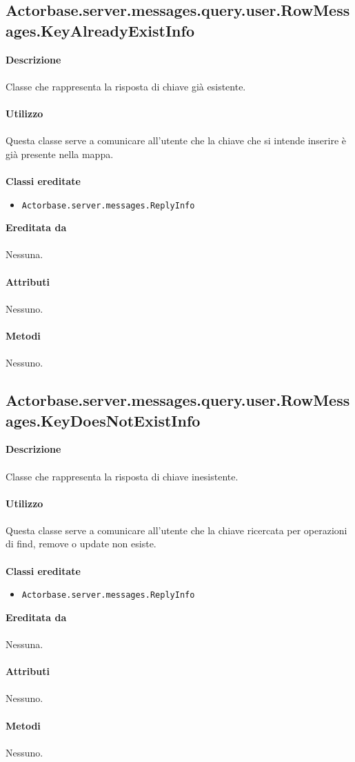 \documentclass[a4paper]{article}
\begin{document}
	\subsection{Actorbase.server.messages.query.user.RowMessages.KeyAlreadyExistInfo}
		\textbf{Descrizione}
			\\ \\
		Classe che rappresenta la risposta di chiave già esistente.
			\\ \\
		\textbf{Utilizzo}
			\\ \\
		Questa classe serve a comunicare all'utente che la chiave che si intende inserire è già presente nella mappa.
			\\ \\
		\textbf{Classi ereditate}
			\begin{itemize}
				\item \texttt{Actorbase.server.messages.ReplyInfo }
			\end{itemize}
		\textbf{Ereditata da}
			\\ \\
			Nessuna.
			\\ \\
		\textbf{Attributi}
			\\ \\
			Nessuno.
			\\ \\
		\textbf{Metodi }
			\\ \\
			Nessuno.
			
	\subsection{Actorbase.server.messages.query.user.RowMessages.KeyDoesNotExistInfo}
		\textbf{Descrizione}
			\\ \\
		Classe che rappresenta la risposta di chiave inesistente.
			\\ \\
		\textbf{Utilizzo}
			\\ \\
		Questa classe serve a comunicare all'utente che la chiave ricercata per operazioni di find, remove o update non esiste.
			\\ \\
		\textbf{Classi ereditate}
			\begin{itemize}
				\item \texttt{Actorbase.server.messages.ReplyInfo }
			\end{itemize}
		\textbf{Ereditata da}
			\\ \\
			Nessuna.
			\\ \\
		\textbf{Attributi}
			\\ \\
			Nessuno.
			\\ \\
		\textbf{Metodi }
			\\ \\
			Nessuno.
			
\end{document}
